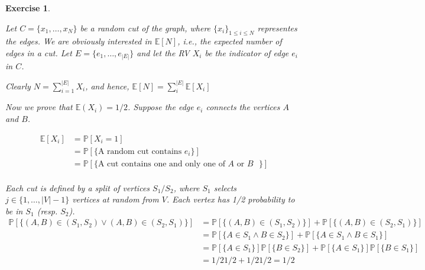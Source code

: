 \documentclass{article}
\newtheorem{exo}{Exercise}
\def\P{\mathbb{P}}
\def\E{\mathbb{E}}
\begin{document}
\begin{exo}{\ \\}

Let $C = \{x_1, \dots, x_N\}$ be a random cut of the graph, where $\{x_i\}_{1\leq i \leq N}$ representes the edges. We are obviously interested in $\E[N]$, i.e., the expected number of edges in a cut. Let $E = \{e_1, \dots, e_{|E|}\}$ and let the RV $X_i$ be the indicator of edge $e_i$ in $C$.


Clearly $\displaystyle N = \sum_{i=1}^{|E|}X_i$, and hence, $\displaystyle \E[N]= \sum_i^{|E|} \E[X_i]$

Now we prove that $\E (X_i) = 1/2$. Suppose the edge $e_i$ connects the vertices $A$ and $B$. 

\begin{align*}
    \E[X_i] &= \P[X_i=1] \\
            &= \P[\{\text{A random cut contains $e_i$}\}] \\
            &= \P[\{\text{A cut contains one and only one of $A$ or $B$  }\}] \\
\end{align*}

Each cut is defined by a split of vertices $S_1 / S_2$, where $S_1$ selects $j \in \{1, \dots, |V|-1\}$ vertices at random from $V$. Each vertex has 1/2 probability to be in $S_1$ (resp. $S_2$). 
\begin{align*}
    \P[\{ (A,B)\in (S_1, S_2) \lor (A,B)\in (S_2, S_1)\}] &= \P[\{ (A,B)\in (S_1, S_2)\}] + \P[\{(A,B)\in (S_2, S_1)\}] \\
                                                          &= \P[\{ A \in S_1 \land B \in S_2 \}] + \P[\{  A \in S_1 \land B \in S_1\}] \\
                                                          &= \P[\{ A \in S_1\}]\P[\{ B \in S_2 \}] + \P[\{A \in S_1\}] \P[\{B \in S_1\}] \\
                                                          &= 1/2 1/2 + 1/2 1/2 = 1/2
\end{align*}


\end{exo}
\end{document}
